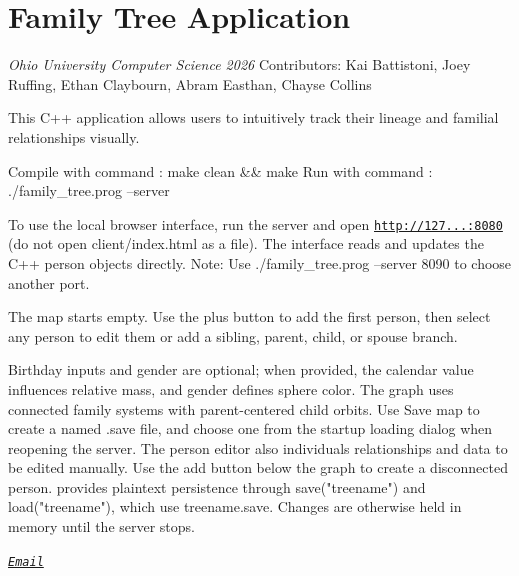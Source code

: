\chapter{Family Tree Application }
\hypertarget{md_README}{}\label{md_README}
\label{md_README_autotoc_md0}%
%


{\itshape Ohio University Computer Science 2026} {\ttfamily  Contributors\+: Kai Battistoni, Joey Ruffing, Ethan Claybourn, Abram Easthan, Chayse Collins} 


This C++ application allows users to intuitively track their lineage and familial relationships visually. ~\newline


Compile with command \+: {\ttfamily make clean \&\& make} Run with command \+: {\ttfamily ./family\+\_\+tree.prog --server}

To use the local browser interface, run the server and open {\ttfamily \href{http://127.0.0.1:8080}{\texttt{http\+://127...\+:8080}}} (do not open {\ttfamily client/index.\+html} as a file). The interface reads and updates the C++ {\ttfamily person} objects directly. Note\+: Use {\ttfamily ./family\+\_\+tree.prog --server 8090} to choose another port.

The map starts empty. Use the plus button to add the first person, then select any person to edit them or add a sibling, parent, child, or spouse branch.

Birthday inputs and gender are optional; when provided, the calendar value influences relative mass, and gender defines sphere color. The graph uses connected family systems with parent-\/centered child orbits. Use Save map to create a named {\ttfamily .save} file, and choose one from the startup \textquotesingle{}loading\textquotesingle{} dialog when reopening the server. The person editor also individuals\textquotesingle{} relationships and data to be edited manually. Use the add button below the graph to create a disconnected person.  provides plaintext persistence through {\ttfamily save("{}treename"{})} and {\ttfamily load("{}treename"{})}, which use {\ttfamily treename.\+save}. Changes are otherwise held in memory until the server stops.

 \href{kb877325@ohio.edu}{\texttt{{\itshape Email}}} 